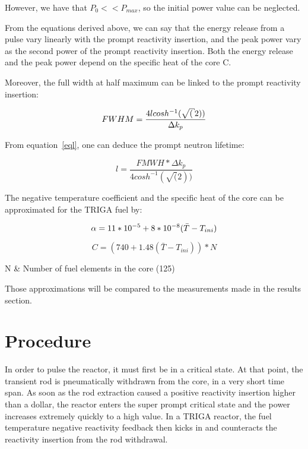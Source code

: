 However, we have that $P_0 << P_{max}$, so the initial power value can be neglected.

From the equations derived above, we can say that the energy release from a pulse vary linearly with the prompt reactivity insertion, and the peak power vary as the second power of the prompt reactivity insertion. Both the energy release and the peak power depend on the specific heat of the core C.

Moreover, the full width at half maximum can be linked to the prompt reactivity insertion:

\begin{equation}{\label{eql}}
FWHM = \frac{4l cosh^{-1}(\sqrt(2))}{\Delta k_p}
\end{equation}

From equation~\ref{eql}, one can deduce the prompt neutron lifetime:

\begin{equation}
l = \frac{FMWH * \Delta k_p}{4 cosh^{-1}(\sqrt(2))}
\end{equation}

The negative temperature coefficient and the specific heat of the core can be approximated for the TRIGA fuel by:

\begin{equation}{\label{eqa}}
\alpha = 11 * 10^{-5} + 8 * 10^{-8}(\bar{T}-T_{ini})
\end{equation}


\begin{equation}
C = (740 + 1.48 (\bar{T}-T_{ini})) * N
\end{equation}
\begin{conditions}
N & Number of fuel elements in the core (125)
\end{conditions}

Those approximations will be compared to the measurements made in the results section.

\section{Procedure}

In order to pulse the reactor, it must first be in a critical state. At that point, the transient rod is pneumatically withdrawn from the core, in a very short time span. As soon as the rod extraction caused a positive reactivity insertion higher than a dollar, the reactor enters the super prompt critical state and the power increases extremely quickly to a high value. In a TRIGA reactor, the fuel temperature negative reactivity feedback then kicks in and counteracts the reactivity insertion from the rod withdrawal.

